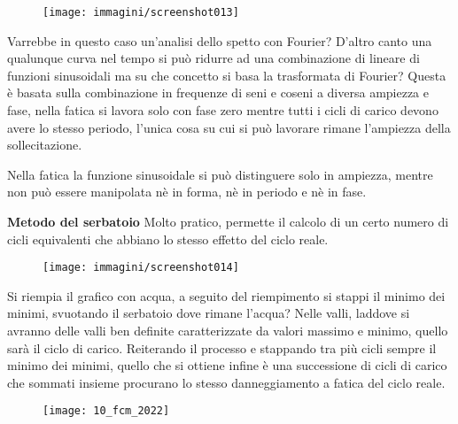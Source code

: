 \documentclass{article}
\begin{document}
\begin{adjustwidth}{2in}{}
		\begin{figure}[H]
			\centering
			\texttt{[image: immagini/screenshot013]}
			\label{fig:screenshot013}
		\end{figure}
		 
		 Varrebbe in questo caso un'analisi dello spetto con Fourier? D'altro canto una qualunque curva nel tempo si può ridurre ad una combinazione di lineare di funzioni sinusoidali ma su che concetto si basa la trasformata di Fourier? Questa è basata sulla combinazione in frequenze di seni e coseni a diversa ampiezza e fase, nella fatica si lavora solo con fase zero mentre tutti i cicli di carico devono avere lo stesso periodo, l'unica cosa su cui si può lavorare rimane l'ampiezza della sollecitazione. 
		 
		 Nella fatica la funzione sinusoidale si può distinguere solo in ampiezza, mentre non può essere manipolata nè in forma, nè in periodo e nè in fase.\newline
		  
		 \textbf{Metodo del serbatoio}\newline
		 Molto pratico, permette il calcolo di un certo numero di cicli equivalenti che abbiano lo stesso effetto del ciclo reale.
		  
		 \begin{figure}[H]
		 	\centering
		 	\texttt{[image: immagini/screenshot014]}
		 	\label{fig:screenshot014}
		 \end{figure}
		 		  
		 Si riempia il grafico con acqua, a seguito del riempimento si stappi il minimo dei minimi, svuotando il serbatoio dove rimane l'acqua? Nelle valli, laddove si avranno delle valli ben definite caratterizzate da valori massimo e minimo, quello sarà il ciclo di carico. Reiterando il processo e stappando tra più cicli sempre il minimo dei minimi, quello che si ottiene infine è una successione di cicli di carico che sommati insieme procurano lo stesso danneggiamento a fatica del ciclo reale.
		 
		 \end{adjustwidth}
		 \begin{figure}[H]
		 \texttt{[image: 10\_fcm\_2022]}
		 \end{figure}
\end{document}
